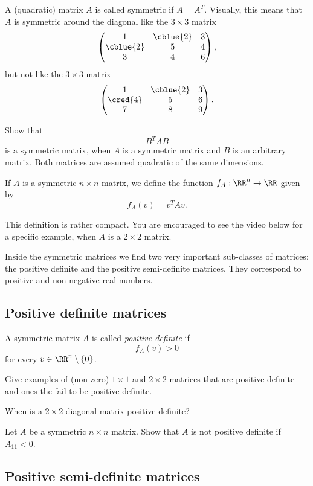 \documentclass{article}
\begin{document}
A (quadratic) matrix $A$ is called symmetric if $A = A^T$. Visually,
this means that $A$ is symmetric around the diagonal like the
$3\times 3$ matrix
$$
\begin{pmatrix}
  1 & \cblue{2} & 3\\
  \cblue{2} & 5 & 4\\
  3 & 4 & 6
\end{pmatrix},
$$
but not like the $3\times 3$ matrix
$$
\begin{pmatrix}
  1 & \cblue{2} & 3\\
  \cred{4} & 5 & 6\\
  7 & 8 & 9
\end{pmatrix}.
$$

\beginshex
Show that
$$
B^T A B
$$
is a symmetric matrix, when $A$ is a symmetric matrix and
$B$ is an arbitrary matrix. Both matrices are assumed
quadratic of the same dimensions.
\endshex


If $A$ is a symmetric $n\times n$ matrix, we define the
function $f_A: \RR^n\rightarrow \RR$ given by
$$
f_A(v) = v^T A v.
$$

This definition is rather compact. You are encouraged to see the video below
for a specific example, when $A$ is a $2\times 2$ matrix.


\begin{video}\label{videoposdef}
\end{video}

Inside the symmetric matrices we find two very important sub-classes
of matrices: the positive definite and the positive semi-definite
matrices. They correspond to positive and non-negative
real numbers.

\subsection{Positive definite matrices}

A symmetric matrix $A$ is called \emph{positive definite} if
$$
f_A(v) > 0
$$
for every $v\in \RR^n\setminus\{0\}$.

\beginshex
Give examples of (non-zero) $1\times 1$ and $2\times 2$ matrices that are
positive definite and ones the fail to be positive
definite.

When is a $2\times 2$ diagonal matrix positive definite?
\endshex

\beginshex
Let $A$ be a symmetric $n\times n$ matrix. Show that
$A$ is not positive definite if $A_{11} < 0$.
\endshex


\subsection{Positive semi-definite matrices}
\end{document}

